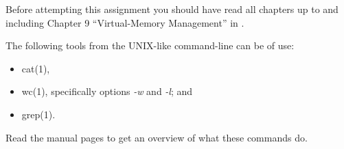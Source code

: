 Before attempting this assignment you should have read all chapters up to and 
including Chapter 9 ``Virtual-Memory Management'' in 
\cite{Silberschatz2013intl,Silberschatz2013osc}.

The following tools from the UNIX-like command-line can be of use:
\begin{itemize}
	\item cat(1),
	\item wc(1), specifically options \emph{-w} and \emph{-l}; and
	\item grep(1).
\end{itemize}
Read the manual pages to get an overview of what these commands do.

